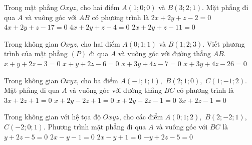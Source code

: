 \begin{ex}%
	Trong mặt phẳng $O x y z$, cho hai điểm $A(1 ; 0 ; 0)$ và $B(3 ; 2 ; 1)$. Mặt phẳng đi qua $A$ và vuông góc với $A B$ có phương trình là
	\choice
	{\True $2 x+2 y+z-2=0$}
	{$4 x+2 y+z-17=0$}
	{$4 x+2 y+z-4=0$}
	{$2 x+2 y+z-11=0$}
\end{ex}
\begin{ex}%
	Trong không gian $Oxyz$, cho hai điểm $A(0 ; 1 ; 1)$  và $B(1 ; 2 ; 3)$. Viết phương trình của mặt phẳng $(P)$ đi qua $A$ và vuông góc với đường thẳng $A B$.
	\choice
	{\True $x+y+2 z-3=0$}
	{$x+y+2z-6=0$}
	{$x+3y+4z-7=0$}
	{$x+3y+4z-26=0$}
\end{ex}

\begin{ex}%
	Trong không gian $O x y z$, cho ba điểm $A(-1 ; 1 ; 1),$ $ B(2 ; 1 ; 0),$ $ C(1 ;-1 ; 2)$. Mặt phẳng đi qua $A$ và vuông góc với đường thẳng $B C$ có phương trình là
	\choice
	{$3 x+2 z+1=0$}
	{\True $x+2 y-2 z+1=0$}
	{$x+2 y-2 z-1=0$}
	{$3 x+2 z-1=0$}
\end{ex}
\begin{ex}%
	Trong không gian với hệ tọa độ $O x y z$, cho các điểm $A(0 ; 1 ; 2), $ $B(2 ;-2 ; 1)$, $C(-2 ; 0 ; 1)$. Phương trình mặt phẳng đi qua $A$ và vuông góc với $B C$ là
	\choice
	{$y+2 z-5=0$}
	{$2 x-y-1=0$}
	{\True $2 x-y+1=0$}
	{$-y+2 z-5=0$}
\end{ex}

